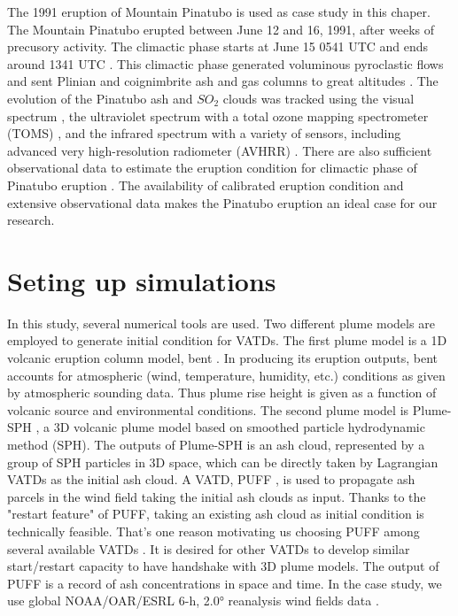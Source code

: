 The 1991 eruption of Mountain Pinatubo is used as case study in this chaper. The Mountain Pinatubo erupted between June 12 and 16, 1991, after weeks of precusory activity. The climactic phase starts at June 15 0541 UTC and ends around 1341 UTC \citep{holasek1996satellite}. This climactic phase generated voluminous pyroclastic flows and sent Plinian and coignimbrite ash and gas columns to great altitudes \citep{scott1996pyroclastic}. The evolution of the Pinatubo ash and $SO_2$ clouds was tracked using the visual spectrum \citep{holasek1996satellite}, the ultraviolet spectrum with a total ozone mapping spectrometer (TOMS) \citep{guo2004re}, and the infrared spectrum with a variety of sensors, including advanced very high-resolution radiometer (AVHRR) \citep{guo2004particles}. There are also sufficient observational data to estimate the eruption condition for climactic phase of Pinatubo eruption \citep{suzuki2009three}. The availability of calibrated eruption condition and extensive observational data makes the Pinatubo eruption an ideal case for our research. 

\section{Seting up simulations} \label{sec:Methodology}

In this study, several numerical tools are used. Two different plume models are employed to generate initial condition for VATDs.
The first plume model is a 1D volcanic eruption column model, bent \citep{bursik2001effect}. In producing its eruption outputs, bent accounts for atmospheric (wind, temperature, humidity, etc.) conditions as given by atmospheric sounding data. Thus plume rise height is given as a function of volcanic source and environmental conditions. The second plume model is Plume-SPH \citep{gmd-2017-119}, a 3D volcanic plume model based on smoothed particle hydrodynamic method (SPH). The outputs of Plume-SPH is an ash cloud, represented by a group of SPH particles in 3D space, which can be directly taken by Lagrangian VATDs as the initial ash cloud. A VATD, PUFF \citep{tanaka1991development,searcy1998puff}, is used to propagate ash parcels in the wind field taking the initial ash clouds as input. Thanks to the "restart feature" of PUFF, taking an existing ash cloud as initial condition is technically feasible. That's one reason motivating us choosing PUFF among several available VATDs \citep[e.g.][]{searcy1998puff,schwaiger2012ash3d}. It is desired for other VATDs to develop similar start/restart capacity to have handshake with 3D plume models. The output of PUFF is a record of ash concentrations in space and time. In the case study, we use global NOAA/OAR/ESRL 6-h, 2.0° reanalysis wind fields data \citep{whitaker2004reanalysis, compo2006feasibility, compo2011twentieth}.

